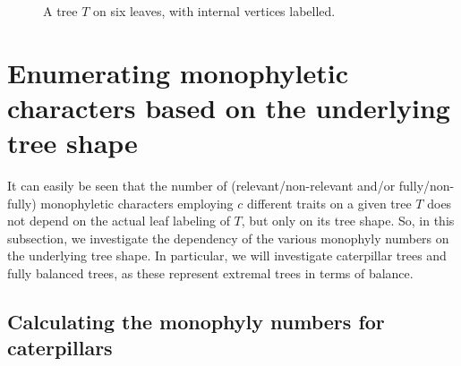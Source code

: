 \documentclass{amsart}
\theoremstyle{definition}
\begin{document}
\begin{figure}
    \centering

    \caption{A tree $T$ on six leaves, with internal vertices labelled.}
    \label{fig:sixleavesexample}
\end{figure}


\section{Enumerating monophyletic characters based on the underlying tree shape}\label{s:treeshape} 

It can easily be seen that the number of (relevant/non-relevant and/or fully/non-fully) monophyletic characters employing $c$ different traits on a given tree $T$ does not depend on the actual leaf labeling of $T$, but only on its tree shape.  
So, in this subsection, we investigate the dependency of the various monophyly numbers on the underlying tree shape. In particular, we will investigate caterpillar trees and  fully balanced trees, as these represent extremal trees in terms of balance. 

\subsection{Calculating  the monophyly numbers for caterpillars}
\end{document}
